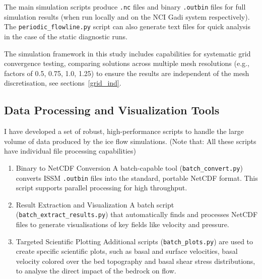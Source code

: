 





The main simulation scripts produce \texttt{.nc} files and binary \texttt{.outbin} files for full simulation results (when run locally and on the NCI Gadi system respectively). The \texttt{periodic\_flowline.py} script can also generate text files for quick analysis in the case of the static diagnostic runs.

The simulation framework in this study includes capabilities for systematic grid convergence testing, comparing solutions across multiple mesh resolutions (e.g., factors of 0.5, 0.75, 1.0, 1.25) to ensure the results are independent of the mesh discretisation, see sections~\ref{grid_ind}.

\subsection{Data Processing and Visualization Tools}\label{dataviz}

I have developed a set of robust, high-performance scripts to handle the large volume of data produced by the ice flow simulations. (Note that: All these scripts have individual file processing capabilities)

\begin{enumerate}
\item{Binary to NetCDF Conversion} A batch-capable tool (\texttt{batch\_convert.py}) converts ISSM \texttt{.outbin} files into the standard, portable NetCDF format. This script supports parallel processing for high throughput.
\item{Result Extraction and Visualization} A batch script (\texttt{batch\_extract\_results.py}) that automatically finds and processes NetCDF files to generate visualisations of key fields like velocity and pressure. 
\item{Targeted Scientific Plotting} Additional scripts (\texttt{batch\_plots.py}) are used to create specific scientific plots, such as basal and surface velocities, basal velocity colored over the bed topography and basal shear stress distributions, to analyse the direct impact of the bedrock on flow.
\end{enumerate}

